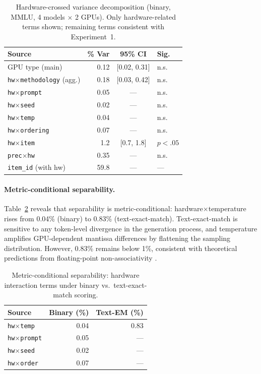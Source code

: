 \documentclass[letterpaper]{article}
\newcommand{\pct}{\%}
\begin{document}
\begin{table}[t]
\centering
\caption{Hardware-crossed variance decomposition (binary, MMLU, 4 models $\times$ 2 GPUs). Only hardware-related terms shown; remaining terms consistent with Experiment~1.}
\label{tab:hardware}
\small
\begin{tabular}{lrcl}
\toprule
Source & \pct{} Var & 95\pct{} CI & Sig. \\
\midrule
GPU type (main)              & 0.12 & [0.02, 0.31] & n.s. \\
\texttt{hw$\times$methodology} (agg.) & 0.18 & [0.03, 0.42] & n.s. \\
\quad \texttt{hw$\times$prompt}     & 0.05 & --- & n.s. \\
\quad \texttt{hw$\times$seed}       & 0.02 & --- & n.s. \\
\quad \texttt{hw$\times$temp}       & 0.04 & --- & n.s. \\
\quad \texttt{hw$\times$ordering}   & 0.07 & --- & n.s. \\
\texttt{hw$\times$item}             & 1.2  & [0.7, 1.8]  & $p<.05$ \\
\texttt{prec$\times$hw}             & 0.35 & --- & n.s. \\
\midrule
\texttt{item\_id} (with hw) & 59.8 & --- & --- \\
\bottomrule
\end{tabular}
\end{table}

\paragraph{Metric-conditional separability.}
Table~\ref{tab:metric-sep} reveals that separability is metric-conditional: hardware$\times$temperature rises from 0.04\pct{} (binary) to 0.83\pct{} (text-exact-match).
Text-exact-match is sensitive to any token-level divergence in the generation process, and temperature amplifies GPU-dependent mantissa differences by flattening the sampling distribution.
However, 0.83\pct{} remains below 1\pct{}, consistent with theoretical predictions from floating-point non-associativity \citep{messina2026}.

\begin{table}[t]
\centering
\caption{Metric-conditional separability: hardware interaction terms under binary vs.\ text-exact-match scoring.}
\label{tab:metric-sep}
\small
\begin{tabular}{lrr}
\toprule
Source & Binary (\pct{}) & Text-EM (\pct{}) \\
\midrule
\texttt{hw$\times$temp}    & 0.04 & 0.83 \\
\texttt{hw$\times$prompt}  & 0.05 & --- \\
\texttt{hw$\times$seed}    & 0.02 & --- \\
\texttt{hw$\times$order}   & 0.07 & --- \\
\bottomrule
\end{tabular}
\end{table}
\end{document}
